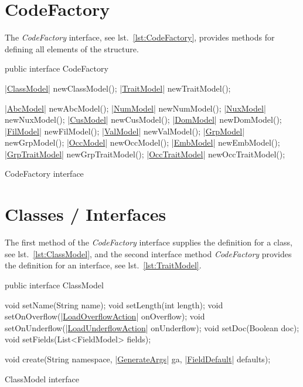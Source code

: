\documentclass[a4paper,10pt]{report}
\newenvironment{elisting}[1][H]
  {\captionsetup{aboveskip=0pt}\begin{listing}[#1]}
  {\end{listing}%
}
\begin{document}
\section{CodeFactory}
The \textsl{CodeFactory} interface, see lst.~\ref{lst:CodeFactory}, provides 
methods for defining all elements of the structure.

\begin{elisting}[!htb]
\begin{javacode}
public interface CodeFactory {
    |\hyperref[lst:ClassModel]{ClassModel}| newClassModel();
    |\hyperref[lst:TraitModel]{TraitModel}| newTraitModel();

    |\hyperref[lst:AbcModel]{AbcModel}| newAbcModel();
    |\hyperref[lst:NumModel]{NumModel}| newNumModel();
    |\hyperref[lst:NuxModel]{NuxModel}| newNuxModel();
    |\hyperref[lst:CusModel]{CusModel}| newCusModel();
    |\hyperref[lst:DomModel]{DomModel}| newDomModel();
    |\hyperref[lst:FilModel]{FilModel}| newFilModel();
    |\hyperref[lst:ValModel]{ValModel}| newValModel();
    |\hyperref[lst:GrpModel]{GrpModel}| newGrpModel();
    |\hyperref[lst:OccModel]{OccModel}| newOccModel();
    |\hyperref[lst:EmbModel]{EmbModel}| newEmbModel();
    |\hyperref[lst:GrpTraitModel]{GrpTraitModel}| newGrpTraitModel();
    |\hyperref[lst:OccTraitModel]{OccTraitModel}| newOccTraitModel();
}
\end{javacode}
\caption{CodeFactory interface}
\label{lst:CodeFactory}
\end{elisting}

\section{Classes / Interfaces}
The first method of the \textsl{CodeFactory} interface supplies the definition 
for a class, see lst.~\ref{lst:ClassModel}, and the second interface method 
\textsl{CodeFactory} provides the definition for an interface, see 
lst.~\ref{lst:TraitModel}.

\begin{elisting}[!htb]
\begin{javacode}
public interface ClassModel {
    void setName(String name);
    void setLength(int length);
    void setOnOverflow(|\hyperref[lst:LoadOverflowAction]{LoadOverflowAction}| onOverflow);
    void setOnUnderflow(|\hyperref[lst:LoadUnderflowAction]{LoadUnderflowAction}| onUnderflow);
    void setDoc(Boolean doc);
    void setFields(List<FieldModel> fields);

    void create(String namespace, |\hyperref[lst:GenerateArgs]{GenerateArgs}| ga, |\hyperref[lst:FieldDefault]{FieldDefault}| defaults);
}
\end{javacode}
\caption{ClassModel interface}
\label{lst:ClassModel}
\end{elisting}
\end{document}
